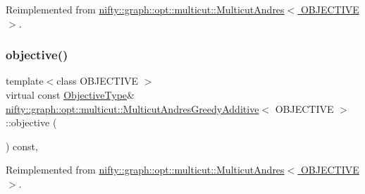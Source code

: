 Reimplemented from \hyperlink{classnifty_1_1graph_1_1opt_1_1multicut_1_1MulticutAndres_ac7a32dbee9103beb72ba2cf6fcd6ecee}{nifty\+::graph\+::opt\+::multicut\+::\+Multicut\+Andres$<$ O\+B\+J\+E\+C\+T\+I\+V\+E $>$}.

\mbox{\label{classnifty_1_1graph_1_1opt_1_1multicut_1_1MulticutAndresGreedyAdditive_a75661ba64e38f54afa83f9006f6d4586}} 
\subsubsection{\texorpdfstring{objective()}{objective()}}
{\footnotesize\ttfamily template$<$class O\+B\+J\+E\+C\+T\+I\+VE $>$ \\
virtual const \hyperlink{classnifty_1_1graph_1_1opt_1_1multicut_1_1MulticutAndres_aed60c2f4ed9c6c6b97e8b513d7a48e86}{Objective\+Type}\& \hyperlink{classnifty_1_1graph_1_1opt_1_1multicut_1_1MulticutAndresGreedyAdditive}{nifty\+::graph\+::opt\+::multicut\+::\+Multicut\+Andres\+Greedy\+Additive}$<$ O\+B\+J\+E\+C\+T\+I\+VE $>$\+::objective (\begin{DoxyParamCaption}{ }\end{DoxyParamCaption}) const\hspace{0.3cm}{\ttfamily [inline]}, {\ttfamily [virtual]}}



Reimplemented from \hyperlink{classnifty_1_1graph_1_1opt_1_1multicut_1_1MulticutAndres_a957dcf0e0fe86e29d14a154141a1458f}{nifty\+::graph\+::opt\+::multicut\+::\+Multicut\+Andres$<$ O\+B\+J\+E\+C\+T\+I\+V\+E $>$}.

\mbox{\label{classnifty_1_1graph_1_1opt_1_1multicut_1_1MulticutAndresGreedyAdditive_a174b41a0f08004dbfe35be189f287446}} 
